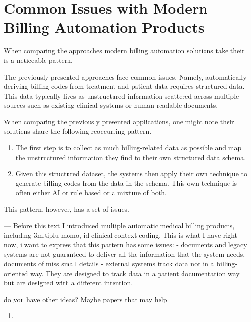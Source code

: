 \section{Common Issues with Modern Billing Automation Products}\label{sec:common-issues-with-modern-billing-automation-products}

When comparing the approaches modern billing automation solutions take their is a noticeable pattern.

The previously presented approaches face common issues.
Namely, automatically deriving billing codes from treatment and patient data requires structured data.
This data typically lives as unstructured information scattered across multiple sources such as existing clinical systems or human-readable documents.

When comparing the previously presented applications, one might note their solutions share the following reoccurring pattern.
\begin{enumerate}
    \item The first step is to collect as much billing-related data as possible and map the unstructured information they find to their own structured data schema.
    \item Given this structured dataset, the systems then apply their own technique to generate billing codes from the data in the schema.
    This own technique is often either AI or rule based or a mixture of both.
\end{enumerate}

This pattern, however, has a set of issues.

---
Before this text I introduced multiple automatic medical billing products, including 3m,tiplu momo, id clinical context coding.
This is what I have right now, i want to express that this pattern has some issues:
- documents and legacy systems are not guaranteed to deliver all the information that the system needs, documents of miss small details
- external systems track data not in a billing-oriented way. They are designed to track data in a patient documentation way but are designed with a different intention.

do you have other ideas? Maybe papers that may help


\begin{enumerate}
    \item
\end{enumerate}
